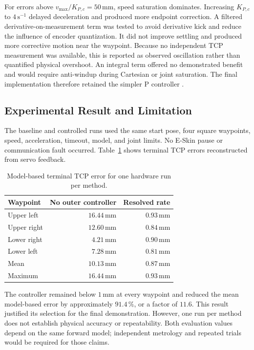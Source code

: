 For errors above \(v_{\max}/K_{P,c}=50\,\mathrm{mm}\), speed saturation
dominates. Increasing \(K_{P,c}\) to \(4\,\mathrm{s}^{-1}\) delayed
deceleration and produced more endpoint correction. A filtered
derivative-on-measurement term was tested to avoid derivative kick and reduce
the influence of encoder quantization. It did not improve settling and produced
more corrective motion near the waypoint. Because no independent TCP
measurement was available, this is reported as observed oscillation rather
than quantified physical overshoot. An integral term offered no demonstrated
benefit and would require anti-windup during Cartesian or joint saturation.
The final implementation therefore retained the simpler P controller
\cite{astrom2008feedback}.

\subsection{Experimental Result and Limitation}

The baseline and controlled runs used the same start pose, four square
waypoints, speed, acceleration, timeout, model, and joint limits. No E-Skin
pause or communication fault occurred. Table~\ref{tab:controller_endpoint_error}
shows terminal TCP errors reconstructed from servo feedback.

\begin{table}[!h]
    \centering
    \caption{Model-based terminal TCP error for one hardware run per method.}
    \label{tab:controller_endpoint_error}
    \begin{tabular}{lrr}
        \hline
        Waypoint & No outer controller & Resolved rate \\
        \hline
        Upper left  & \(16.44\,\mathrm{mm}\) & \(0.93\,\mathrm{mm}\) \\
        Upper right & \(12.60\,\mathrm{mm}\) & \(0.84\,\mathrm{mm}\) \\
        Lower right & \(4.21\,\mathrm{mm}\)  & \(0.90\,\mathrm{mm}\) \\
        Lower left  & \(7.28\,\mathrm{mm}\)  & \(0.81\,\mathrm{mm}\) \\
        \hline
        Mean        & \(10.13\,\mathrm{mm}\) & \(0.87\,\mathrm{mm}\) \\
        Maximum     & \(16.44\,\mathrm{mm}\) & \(0.93\,\mathrm{mm}\) \\
        \hline
    \end{tabular}
\end{table}

The controller remained below \(1\,\mathrm{mm}\) at every waypoint and reduced
the mean model-based error
by approximately \(91.4\,\%\), or a factor of \(11.6\). This result justified
its selection for the final demonstration. However, one run per method does
not establish physical accuracy or repeatability. Both evaluation values
depend on the same forward model; independent metrology and repeated trials
would be required for those claims.
